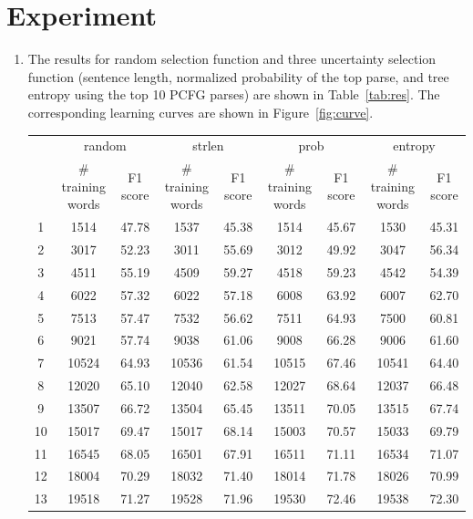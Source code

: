\documentclass[winfonts,UTF8]{article}
\begin{document}
\section{Experiment}
\begin{enumerate}
\item
The results for random selection function and three uncertainty selection function (sentence length, normalized probability of the top parse, and tree entropy using the top 10 PCFG parses) are shown in Table~\ref{tab:res}. The corresponding learning curves are shown in Figure~\ref{fig:curve}.



\begin{table}[!htbp]
\centering
{\footnotesize
\begin{tabular}{c|c|c|c|c|c|c|c|c}
\hline 
 & \multicolumn{2}{|c|}{random} &  \multicolumn{2}{|c|}{strlen} & \multicolumn{2}{|c}{prob} & \multicolumn{2}{|c}{entropy} \\ 
 \cline{2-9}
 & \# training words & F1 score & \# training words & F1 score & \# training words & F1 score & \# training words & F1 score\\ 
\hline
1 & 1514 & 47.78 & 1537 & 45.38 & 1514 & 45.67 & 1530 & 45.31\\
\hline
2 & 3017 & 52.23 & 3011 & 55.69 & 3012 & 49.92 & 3047 & 56.34\\
\hline
3 & 4511 & 55.19 & 4509 & 59.27 & 4518 & 59.23 & 4542 & 54.39\\
\hline
4 & 6022 & 57.32 & 6022 & 57.18 & 6008 & 63.92 & 6007 & 62.70\\
\hline
5 & 7513 & 57.47 & 7532 & 56.62 & 7511 & 64.93 & 7500 & 60.81\\
\hline
6 & 9021 & 57.74 & 9038 & 61.06 & 9008 & 66.28 & 9006 & 61.60\\
\hline
7 & 10524 & 64.93 & 10536 & 61.54 & 10515 & 67.46 & 10541 & 64.40\\
\hline
8 & 12020 & 65.10 & 12040 & 62.58 & 12027 & 68.64 & 12037 & 66.48\\
\hline
9 & 13507 & 66.72 & 13504 & 65.45 & 13511 & 70.05 & 13515 & 67.74\\
\hline
10 & 15017 & 69.47 & 15017 & 68.14 & 15003 & 70.57 & 15033 & 69.79\\
\hline
11 & 16545 & 68.05 & 16501 & 67.91 & 16511 & 71.11 & 16534 & 71.07\\
\hline
12 & 18004 & 70.29 & 18032 & 71.40 & 18014 & 71.78 & 18026 & 70.99\\
\hline
13 & 19518 & 71.27 & 19528 & 71.96 & 19530 & 72.46 & 19538 & 72.30\\

\end{tabular}}
\end{table}
\end{enumerate}
\end{document}

